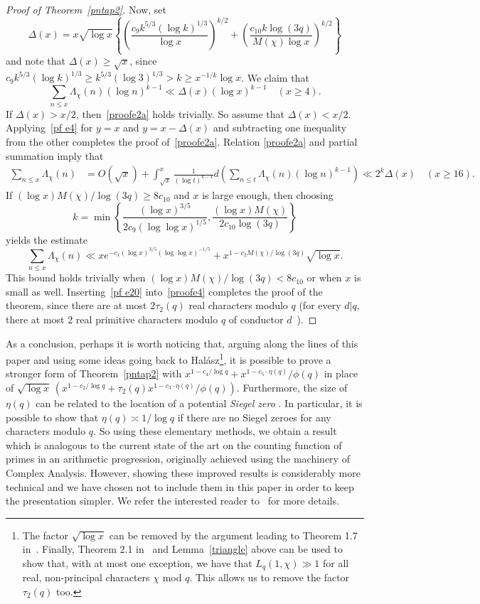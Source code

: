 \documentclass[12pt]{amsart}
\theoremstyle{remark}
\newcommand{\bsp}{\begin{split}}
\newcommand{\be}{\begin{equation}}
\newcommand{\ee}{\end{equation}}
\newcommand{\bes}{\begin{equation*}}
\newcommand{\ees}{\end{equation*}}
\numberwithin{equation}{section}
\begin{document}
\begin{proof}[Proof of Theorem~\ref{pntap2}]
Now, set
$$
\Delta(x) = x\sqrt{\log x}\left\{ \left( \frac{c_9k^{5/3}(\log k)^{1/3}} {\log x} \right)^{k/2}
+ \left( \frac{c_{10}k\log(3q)} {M(\chi)\log x} \right)^{k/2} \right\}
$$
and note that $\Delta(x)\ge\sqrt{x}$, since $c_9k^{5/3}(\log k)^{1/3}\ge k^{5/3}(\log 3)^{1/3}>k\ge x^{-1/k}\log x$. We claim that
\be\label{proofe2a}
\sum_{n\le x}\Lambda_\chi(n)(\log n)^{k-1}\ll\Delta(x)(\log x)^{k-1}\quad(x\ge4).
\ee
If $\Delta(x)>x/2$, then~\eqref{proofe2a} holds trivially. So assume that $\Delta(x)<x/2$. Applying~\eqref{pf e4} for $y=x$ and $y=x-\Delta(x)$ and subtracting one inequality from the other completes the proof of~\eqref{proofe2a}. Relation \eqref{proofe2a} and partial summation imply that
\bes\bsp
\sum_{n\le x}\Lambda_\chi(n)&=O(\sqrt{x})+\int_{\sqrt{x}}^x\frac1{(\log t)^{k-1}}d\left(\sum_{n\le t}\Lambda_\chi(n)(\log n)^{k-1}\right) \ll 2^k\Delta(x)\quad(x\ge16).
\end{split}\ees
If $(\log x)M(\chi)/\log(3q) \ge 8c_{10}$ and $x$ is large enough, then choosing
\[
k= \min \left\{ \frac{ (\log x)^{3/5} }{ 2c_9(\log\log x)^{1/5} }, \frac{(\log x) M(\chi) }{ 2c_{10} \log(3q) } \right\}
\]
yields the estimate
\be\label{pf e20}
\sum_{n\le x}\Lambda_\chi(n)\ll xe^{-c_1(\log x)^{3/5}(\log\log x)^{-1/5}} + x^{1-c_2 M(\chi)/\log(3q)} \sqrt{\log x} .
\ee
This bound holds trivially when $(\log x)M(\chi)/\log(3q)<8c_{10}$ or when $x$ is small as well. Inserting~\eqref{pf e20} into~\eqref{proofe4} completes the proof of the theorem, since there are at most $2\tau_2(q)$ real characters modulo $q$ (for every $d|q$, there at most 2 real primitive characters modulo $q$ of conductor $d$~\cite[Chapter 5]{Dav}).
\end{proof}

As a conclusion, perhaps it is worth noticing that, arguing along the lines of this paper and using some ideas going back to Hal\'asz\footnote{The factor $\sqrt{\log x}$ can be removed by the argument leading to Theorem 1.7 in~\cite{kou}. Finally, Theorem 2.1 in~\cite{kou} and Lemma~\ref{triangle} above can be used to show that, with at most one exception, we have that $L_q(1,\chi)\gg1$ for all real, non-principal characters $\chi$ mod $q$. This allows us to remove the factor $\tau_2(q)$ too.}, it is possible to prove a stronger form of Theorem~\ref{pntap2} with $x^{1-c_4/\log q}+ x^{1-c_5\cdot \eta(q)}/\phi(q)$ in place of $ \sqrt{\log x}\,(x^{1-c_2/\log q} + \tau_2(q) x^{1-c_3\cdot \eta(q)}/\phi(q) )$. Furthermore, the size of $\eta(q)$ can be related to the location of a potential {\it Siegel zero} \cite[Theorem 2.4]{kou}. In particular, it is possible to show that $\eta(q)\asymp1/\log q$ if there are no Siegel zeroes for any characters modulo $q$. So using these elementary methods, we obtain a result which is analogous to the current state of the art on the counting function of primes in an arithmetic progression, originally achieved using the machinery of Complex Analysis. However, showing these improved results is considerably more technical and we have chosen not to include them in this paper in order to keep the presentation simpler. We refer the interested reader to~\cite{kou} for more details.
\end{document}
